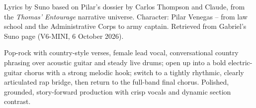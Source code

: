 
\begin{notes}
Lyrics by Suno based on Pilar's dossier by Carlos Thompson and Claude, from the \emph{Thomas’ Entourage} narrative universe. Character: Pilar Venegas -- from law school and the Administrative Corps to army captain. Retrieved from Gabriel's Suno page (V6-MINI, 6 October 2026).
\end{notes}
\begin{style}
Pop-rock with country-style verses, female lead vocal, conversational country phrasing over acoustic guitar and steady live drums; open up into a bold electric-guitar chorus with a strong melodic hook; switch to a tightly rhythmic, clearly articulated rap bridge, then return to the full-band final chorus. Polished, grounded, story-forward production with crisp vocals and dynamic section contrast.
\end{style}
